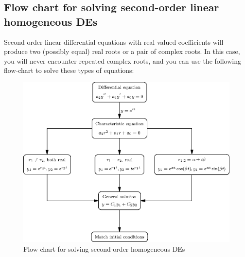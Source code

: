 \documentclass{book}
\begin{document}


\newpage
\subsection{Flow chart for solving second-order linear homogeneous DEs}

Second-order linear differential equations with real-valued
coefficients will produce two (possibly equal) real roots or a pair of
complex roots.  In this case, you will never encounter repeated complex roots,
and you can use the following flow-chart to solve these types of equations:

\vspace{0.5in}
\begin{figure}[h]
  \centering
  \includegraphics{201/linhomflow}
  \caption{Flow chart for solving second-order homogeneous DEs}
  \label{fig:linhomflow}
\end{figure}


\end{document}
